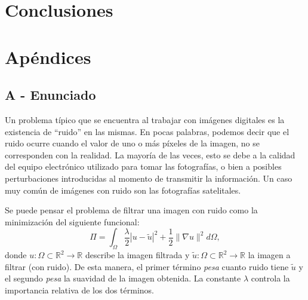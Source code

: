 \documentclass[a4paper]{article}
\begin{document}
\newpage

\section{Conclusiones}


\newpage

\section{Apéndices}

\subsection{A - Enunciado}

Un problema típico que se encuentra al trabajar con imágenes digitales es la existencia de ``ruido'' en las mismas. En pocas palabras, podemos decir que el ruido ocurre cuando el valor de uno o más píxeles de la imagen, no se corresponden con la realidad. La mayor\'ia de las veces, esto se debe a la calidad del equipo electr\'onico utilizado para tomar las fotograf\'ias, o bien a posibles perturbaciones introducidas al momento de transmitir la informaci\'on. Un caso muy com\'un de im\'agenes con ruido son las fotograf\'ias satelitales.


Se puede pensar el problema de filtrar una imagen con ruido como la minimizaci\'on del siguiente funcional:
\begin{equation}
  \Pi = \int_\Omega {\frac{\lambda}{2} \left| u - \tilde{u} \right|^2 + \frac{1}{2} \lVert \nabla u \rVert^2 } d\Omega,
\label{funcional}
\end{equation}
donde $u : \Omega \subset \mathbb{R}^2 \to \mathbb{R}$ describe la imagen filtrada y
$\tilde{u} : \Omega \subset \mathbb{R}^2 \to \mathbb{R}$ la imagen a filtrar (con ruido).
De esta manera, el primer t\'ermino \emph{pesa} cuanto ruido tiene $\tilde{u}$ y el segundo \emph{pesa} la suavidad de la imagen obtenida. La constante $\lambda$ controla la importancia relativa de los dos t\'erminos.
\end{document}

